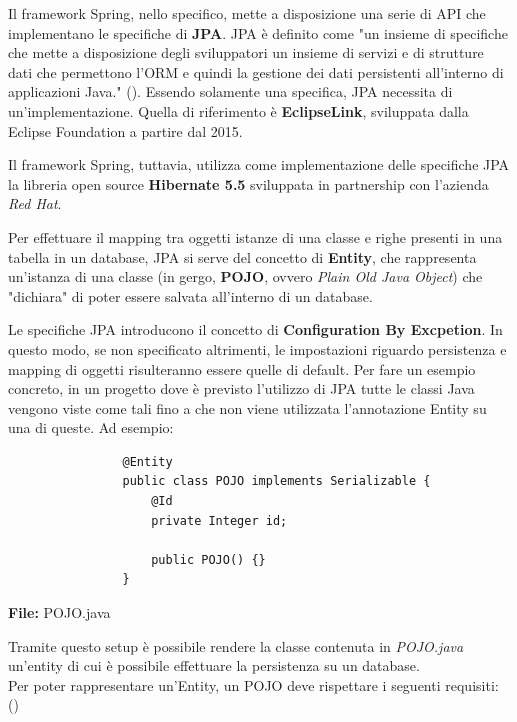         Il framework Spring, nello specifico, mette a disposizione una serie di API che implementano le specifiche di \textbf{JPA}. JPA è definito come "un insieme di specifiche che mette a disposizione degli sviluppatori un insieme di servizi e di strutture dati che permettono l'ORM e quindi la gestione dei dati persistenti all'interno di applicazioni Java." (\cite{jpa}). Essendo solamente una specifica, JPA necessita di un'implementazione. Quella di riferimento è \textbf{EclipseLink}, sviluppata dalla Eclipse Foundation a partire dal 2015.

        Il framework Spring, tuttavia, utilizza come implementazione delle specifiche JPA la libreria open source \textbf{Hibernate 5.5} sviluppata in partnership con l'azienda \textit{Red Hat}. 

        Per effettuare il mapping tra oggetti istanze di una classe e righe presenti in una tabella in un database, JPA si serve del concetto di \textbf{Entity}, che rappresenta un'istanza di una classe (in gergo, \textbf{POJO}, ovvero \textit{Plain Old Java Object}) che "dichiara" di poter essere salvata all'interno di un database.

        Le specifiche JPA introducono il concetto di \textbf{Configuration By Excpetion}. In questo modo, se non specificato altrimenti, le impostazioni riguardo persistenza e mapping di oggetti risulteranno essere quelle di default. Per fare un esempio concreto, in un progetto dove è previsto l'utilizzo di JPA tutte le classi Java vengono viste come tali fino a che non viene utilizzata l'annotazione Entity su una di queste. Ad esempio:

        \begin{code}
            \begin{verbatim}
                @Entity
                public class POJO implements Serializable {
                    @Id 
                    private Integer id;

                    public POJO() {}
                }
            \end{verbatim}
            \caption{\textbf{File:} POJO.java}
        \end{code}
    
        Tramite questo setup è possibile rendere la classe contenuta in \textit{POJO.java} un'entity di cui è possibile effettuare la persistenza su un database.\\

        Per poter rappresentare un'Entity, un POJO deve rispettare i seguenti requisiti: (\cite{jee7})

